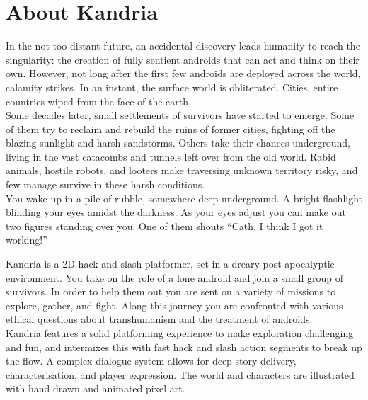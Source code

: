 \section{About Kandria}
In the not too distant future, an accidental discovery leads humanity to reach the singularity: the creation of fully sentient androids that can act and think on their own. However, not long after the first few androids are deployed across the world, calamity strikes. In an instant, the surface world is obliterated. Cities, entire countries wiped from the face of the earth. \\

Some decades later, small settlements of survivors have started to emerge. Some of them try to reclaim and rebuild the ruins of former cities, fighting off the blazing sunlight and harsh sandstorms. Others take their chances underground, living in the vast catacombs and tunnels left over from the old world. Rabid animals, hostile robots, and looters make traversing unknown territory risky, and few manage survive in these harsh conditions. \\

You wake up in a pile of rubble, somewhere deep underground. A bright flashlight blinding your eyes amidst the darkness. As your eyes adjust you can make out two figures standing over you. One of them shouts ``Cath, I think I got it working!'' \\

\vskip1cm

Kandria is a 2D hack and slash platformer, set in a dreary post apocalyptic environment. You take on the role of a lone android and join a small group of survivors. In order to help them out you are sent on a variety of missions to explore, gather, and fight. Along this journey you are confronted with various ethical questions about transhumanism and the treatment of androids. \\

Kandria features a solid platforming experience to make exploration challenging and fun, and intermixes this with fast hack and slash action segments to break up the flow. A complex dialogue system allows for deep story delivery, characterisation, and player expression. The world and characters are illustrated with hand drawn and animated pixel art.

